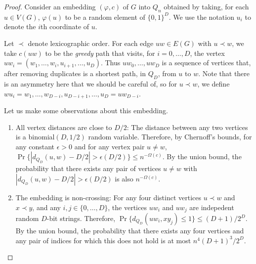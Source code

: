 \documentclass{patmorin}
\newcommand{\eps}{\epsilon}
\begin{document}
\begin{proof}
   Consider an embedding $(\varphi,c)$ of $G$ into $Q_n$ obtained by
   taking, for each $u\in V(G)$, $\varphi(u)$ to be a random element of
   $\{0,1\}^D$.  We use the notation $u_i$ to denote the $i$th coordinate
   of $u$.

   Let $\prec$ denote lexicographic order.  For each edge
   $uw\in E(G)$ with $u\prec w$, we take $c(uw)$ to be the
   \emph{greedy} path that visits, for $i=0,\ldots,D$, the vertex
   $uw_i=(w_1,\ldots,w_i,u_{i+1},\ldots,u_D)$.  Thus $uw_0,\ldots,uw_D$
   is a sequence of vertices that, after removing duplicates is a
   shortest path, in $Q_D$, from $u$ to $w$.  Note that there is an
   asymmetry here that we should be careful of, so for $u\prec w$,
   we define $wu_i=w_1,\ldots,w_{D-i},u_{D-i+1},\ldots,u_{D}=uw_{D-i}$.
 
   Let us make some observations about this embedding.
   \begin{enumerate}
      \item All vertex distances are close to $D/2$:
       The distance between any two vertices is a
       binomial$(D,1/2)$ random variable.  Therefore, by Chernoff's
       bounds, for any constant $\eps>0$ and for any vertex pair $u\neq
       w$, $\Pr\{|d_{Q_D}(u,w)-D/2| > \eps(D/2)\} \le n^{-\Omega(c)}$.  By the
       union bound, the probability that there exists any pair of vertices
       $u\neq w$ with $|d_{Q_D}(u,w)-D/2| > \eps(D/2)$ is also $n^{-\Omega(c)}$.

      \item The embedding is non-crossing: For any four distinct vertices
      $u\prec w$ and $x\prec y$, and any $i,j\in\{0,\ldots,D\}$, the
      vertices $uw_i$ and $uw_j$ are indepedent random $D$-bit strings.
      Therefore, $\Pr\{d_{Q_D}(uw_i,xy_j)\le 1\} \le (D+1)/2^{D}$.
      By the union bound, the probability that there exists any four
      vertices and any pair of indices for which this does not hold is
      at most $n^4(D+1)^3/2^{D}$.


\end{enumerate}
\end{proof}
\end{document}
